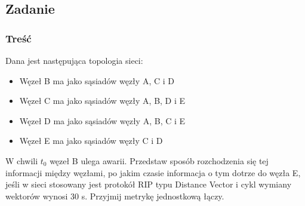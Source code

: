 \documentclass[a4paper,twoside]{article}
\begin{document}
\subsection{Zadanie}
\subsubsection{Treść}
Dana jest następująca topologia sieci:
\begin{itemize}
	\item Węzeł B ma jako sąsiadów węzły A, C i D
	\item Węzeł C ma jako sąsiadów węzły A, B, D i E
	\item Węzeł D ma jako sąsiadów węzły A, B, C i E
	\item Węzeł E ma jako sąsiadów węzły C i D
\end{itemize}
W chwili $ t_0 $ węzeł B ulega awarii. Przedstaw sposób rozchodzenia się tej informacji między węzłami, po jakim czasie informacja o tym dotrze do węzła E, jeśli w sieci stosowany jest protokół RIP typu Distance Vector i cykl wymiany wektorów wynosi 30 s. Przyjmij metrykę jednostkową łączy.
\end{document}
